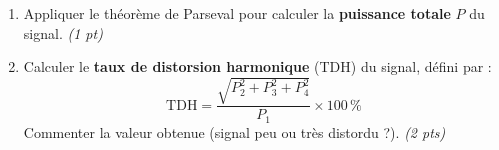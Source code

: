 \documentclass[a4paper,11pt]{article}
\begin{document}
\begin{enumerate}[label=\textbf{\arabic*.}]
  \item Appliquer le théorème de Parseval pour calculer la \textbf{puissance totale} $P$ du signal.
        \hfill \textit{(1 pt)}
  \begin{tcolorbox}[reponsebox, height=2cm]\end{tcolorbox}

  \item Calculer le \textbf{taux de distorsion harmonique} (TDH) du signal, défini par :
        \[
          \mathrm{TDH} = \frac{\sqrt{P_2^2 + P_3^2 + P_4^2}}{P_1} \times 100\,\%
        \]
        Commenter la valeur obtenue (signal peu ou très distordu ?).
        \hfill \textit{(2 pts)}
  \begin{tcolorbox}[reponsebox, height=3.5cm]\end{tcolorbox}

\end{enumerate}
\end{document}
